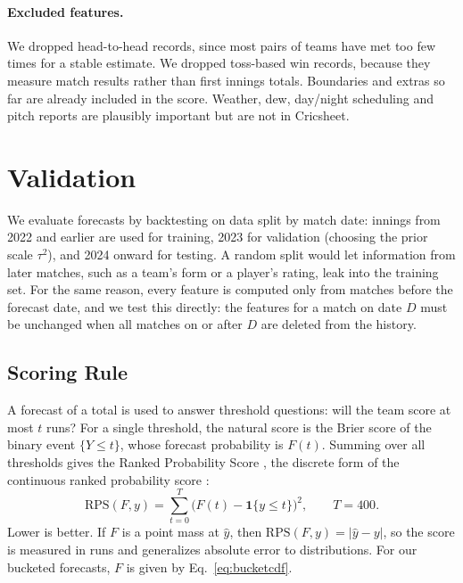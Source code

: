 \documentclass{article}
\newcommand{\1}{\mathbf{1}}
\newcommand{\RPS}{\mathrm{RPS}}
\begin{document}
\paragraph{Excluded features.} We dropped head-to-head records, since most pairs of teams have met too few times for a stable estimate. We dropped toss-based win records, because they measure match results rather than first innings totals. Boundaries and extras so far are already included in the score. Weather, dew, day/night scheduling and pitch reports are plausibly important but are not in Cricsheet.

\section{Validation}\label{sec:validation}
We evaluate forecasts by backtesting on data split by match date: innings from 2022 and earlier are used for training, 2023 for validation (choosing the prior scale $\tau^2$), and 2024 onward for testing. A random split would let information from later matches, such as a team's form or a player's rating, leak into the training set. For the same reason, every feature is computed only from matches before the forecast date, and we test this directly: the features for a match on date $D$ must be unchanged when all matches on or after $D$ are deleted from the history.

\subsection{Scoring Rule}\label{sec:scoring}
A forecast of a total is used to answer threshold questions: will the team score at most $t$ runs? For a single threshold, the natural score is the Brier score \citep{brier1950} of the binary event $\{Y \le t\}$, whose forecast probability is $F(t)$. Summing over all thresholds gives the Ranked Probability Score \citep{epstein1969}, the discrete form of the continuous ranked probability score \citep{matheson1976,gneiting2007}:
\begin{equation}\label{eq:rps}
\RPS(F, y) = \sum_{t=0}^{T} \big(F(t) - \1\{y \le t\}\big)^2, \qquad T = 400.
\end{equation}
Lower is better. If $F$ is a point mass at $\hat y$, then $\RPS(F, y) = |\hat y - y|$, so the score is measured in runs and generalizes absolute error to distributions. For our bucketed forecasts, $F$ is given by Eq.~\eqref{eq:bucketcdf}.
\end{document}
